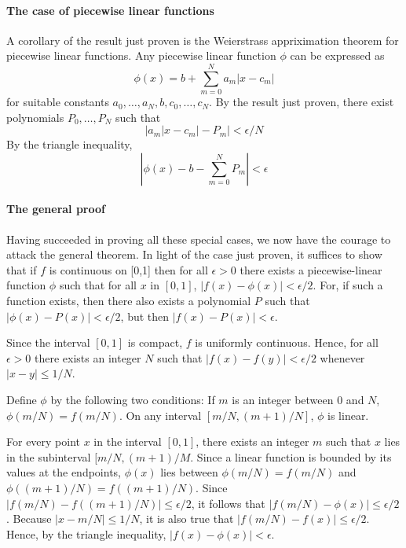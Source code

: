 \documentclass[12pt]{article}
\begin{document}
\paragraph{The case of piecewise linear functions}
A corollary of the result just proven is the Weierstrass appriximation theorem for piecewise linear functions.  Any piecewise linear function $\phi$ can be expressed as
 $$\phi(x) = b + \sum_{m=0}^N a_m |x-c_m|$$
for suitable constants $a_0, \ldots , a_N, b, c_0, \ldots , c_N$.  By the result just proven, there exist polynomials $P_0, \ldots,P_N$ such that
 $$\left| a_m |x - c_m| - P_m \right| < \epsilon / N$$
By the triangle inequality,
 $$\left| \phi (x) - b - \sum_{m=0}^N P_m \right| < \epsilon$$

\paragraph{The general proof}
Having succeeded in proving all these special cases, we now have the courage to attack the general theorem.  In light of the case just proven, it suffices to show that if $f$ is continuous on [0,1] then for all $\epsilon > 0$ there exists a piecewise-linear function $\phi$ such that for all $x$ in $[0,1]$, $|f(x) - \phi (x)| < \epsilon / 2$.  For, if such a function exists, then there also exists a polynomial $P$ such that $|\phi(x) - P(x)| < \epsilon / 2$, but then $|f(x) - P(x)| < \epsilon$.

Since the interval $[0,1]$ is compact, $f$ is uniformly continuous.  Hence, for all $\epsilon > 0$ there exists an integer $N$ such that $|f(x) - f(y)| < \epsilon / 2$ whenever $|x - y| \le 1/N$.

Define $\phi$ by the following two conditions:  If $m$ is an integer between $0$ and $N$, $\phi (m/N) = f (m/N)$.  On any interval $[m/N,(m+1)/N]$, $\phi$ is linear.

For every point $x$ in the interval $[0,1]$, there exists an integer $m$ such that $x$ lies in the subinterval $[m/N,(m+1)/M$.  Since a linear function is bounded by its values at the endpoints, $\phi(x)$ lies between $\phi(m/N) = f(m/N)$ and $\phi((m+1)/N) = f((m+1)/N)$.   Since $|f(m/N) - f((m+1)/N)| \le \epsilon/2$, it follows that $|f(m/N) - \phi(x)| \le \epsilon/2$.  Because $|x - m/N| \le 1/N$, it is also true that $|f(m/N) - f(x)| \le \epsilon/2$.  Hence, by the triangle inequality, $|f(x) - \phi(x)| < \epsilon$.
\end{document}
